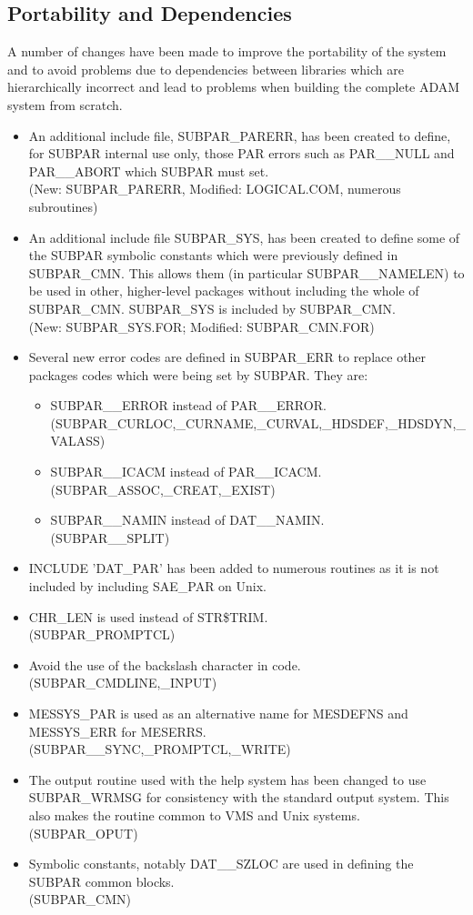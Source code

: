 \subsection{Portability and Dependencies}
A number of changes have been made to improve the portability of the system
and to avoid problems due to dependencies between libraries which are
hierarchically incorrect and lead to problems when building the complete
ADAM system from scratch.
\begin{itemize}
\item An additional include file, SUBPAR\_PARERR, has been created
to define, for SUBPAR internal use only, those PAR errors such as PAR\_\_NULL
and PAR\_\_ABORT which SUBPAR must set.\\
(New: SUBPAR\_PARERR,  Modified: LOGICAL.COM, numerous subroutines)
\item An additional include file SUBPAR\_SYS, has been created to define some
of the SUBPAR symbolic constants which were previously defined in SUBPAR\_CMN.
This allows them (in particular SUBPAR\_\_NAMELEN) to be used in other,
higher-level packages without including the whole of SUBPAR\_CMN.
SUBPAR\_SYS is included by SUBPAR\_CMN.\\
(New: SUBPAR\_SYS.FOR; Modified: SUBPAR\_CMN.FOR)
\item Several new error codes are defined in SUBPAR\_ERR to replace other
packages codes which were being set by SUBPAR. They are:
\begin{itemize}
\item SUBPAR\_\_ERROR instead of PAR\_\_ERROR.\\
(SUBPAR\_CURLOC,\_CURNAME,\_CURVAL,\_HDSDEF,\_HDSDYN,\_VALASS)
\item SUBPAR\_\_ICACM instead of PAR\_\_ICACM.\\
(SUBPAR\_ASSOC,\_CREAT,\_EXIST)
\item SUBPAR\_\_NAMIN instead of DAT\_\_NAMIN.\\
(SUBPAR\_\_SPLIT)
\end{itemize}
\item INCLUDE 'DAT\_PAR' has been added to numerous routines as it is not
included by including SAE\_PAR on Unix.
\item CHR\_LEN is used instead of STR\$TRIM.\\
(SUBPAR\_PROMPTCL)
\item Avoid the use of the backslash character in code.\\
(SUBPAR\_CMDLINE,\_INPUT)
\item MESSYS\_PAR is used as an alternative  name for MESDEFNS and MESSYS\_ERR
for MESERRS.\\
(SUBPAR\_\_SYNC,\_PROMPTCL,\_WRITE)
\item The output routine used with the help system has been changed to use
SUBPAR\_WRMSG for consistency with the standard output system.
This also makes the routine common to VMS and Unix systems.\\
(SUBPAR\_OPUT)
\item Symbolic constants, notably DAT\_\_SZLOC are used in defining the SUBPAR
common blocks.\\
(SUBPAR\_CMN)
\end{itemize}


